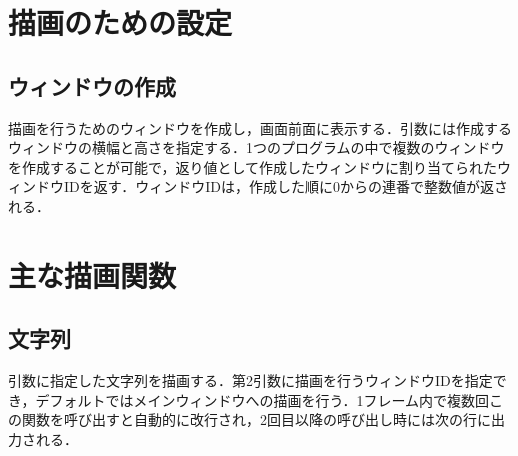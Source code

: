 \documentclass[a4paper, 11pt, oneside, onecolumn, openany]{jsarticle}
\begin{document}
\section{描画のための設定}
\subsection{ウィンドウの作成}
描画を行うためのウィンドウを作成し，画面前面に表示する．引数には作成するウィンドウの横幅と高さを指定する．1つのプログラムの中で複数のウィンドウを作成することが可能で，返り値として作成したウィンドウに割り当てられたウィンドウIDを返す．ウィンドウIDは，作成した順に0からの連番で整数値が返される．


\section{主な描画関数}

\subsection{文字列}
引数に指定した文字列を描画する．第2引数に描画を行うウィンドウIDを指定でき，デフォルトではメインウィンドウへの描画を行う．1フレーム内で複数回この関数を呼び出すと自動的に改行され，2回目以降の呼び出し時には次の行に出力される．
\end{document}
